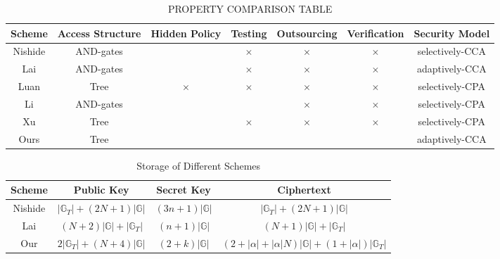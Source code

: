 \documentclass[smallextended]{svjour3}       %
\begin{document}
\begin{table}[h] 
	\caption{PROPERTY COMPARISON TABLE}
	\resizebox{\textwidth}{12mm}
	{
		\begin{tabular}{|c|c|c|c|c|c|c|}
		\hline
		\textbf{Scheme} & \textbf{Access Structure} & \textbf{Hidden Policy} & \textbf{Testing} & \textbf{Outsourcing} & \textbf{Verification} &\textbf{Security Model} \\
		\hline 
		Nishide & AND-gates & \checkmark & $\times$   & $\times$   & $\times$   & selectively-CCA \\ \hline
		Lai     & AND-gates & \checkmark & $\times$   & $\times$   & $\times$   & adaptively-CCA  \\ \hline
		Luan    & Tree 		& $\times$   & $\times$   & $\times$   & $\times$   & selectively-CPA \\ \hline
		Li		& AND-gates & \checkmark & \checkmark & $\times$   & $\times$   & selectively-CPA \\ \hline
		Xu		& Tree		& \checkmark & $\times$   & $\times$   & $\times$   & selectively-CPA \\ \hline	
		Ours    & Tree 		& \checkmark & \checkmark & \checkmark & \checkmark & adaptively-CCA  \\ \hline
		\end{tabular}
	}
	\label{propertyTable}
\end{table}

\begin{table}[h]
	\caption{Storage of Different Schemes}
	\resizebox{\textwidth}{10mm}
	{
		\begin{tabular}{|c|c|c|c|}
			\hline
			\textbf{Scheme} & \textbf{Public Key} & \textbf{Secret Key} & \textbf{Ciphertext} \\ 
			\hline
			Nishide & $|\mathbb{G}_T|+(2N+1)|\mathbb{G}|$ & $(3n+1)|\mathbb{G}|$ & $|\mathbb{G}_T|+(2N+1)|\mathbb{G}|$  \\ \hline
			Lai & $(N+2)|\mathbb{G}|+|\mathbb{G}_T|$ & $(n+1)|\mathbb{G}|$ & $(N+1)|\mathbb{G}|+|\mathbb{G}_T|$ \\ \hline
			Our & $2|\mathbb{G}_T|+(N+4)|\mathbb{G}|$ & $(2+k)|\mathbb{G}|$ & $(2+|\alpha|+|\alpha|N)|\mathbb{G}|+(1+|\alpha|)|\mathbb{G}_T|$  \\ \hline
		\end{tabular}
	}
	\label{storageTable}
\end{table}
\end{document}
